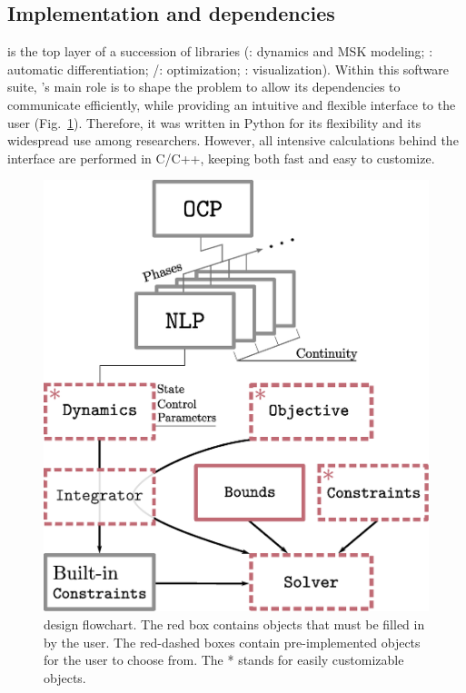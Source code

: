 \subsection{Implementation and dependencies}
\bioptim is the top layer of a succession of libraries (\biorbd: dynamics and MSK modeling; \casadi: automatic differentiation; \ipopt/\acados: optimization; \bioviz: visualization).
Within this software suite, \bioptim 's main role is to shape the problem to allow its dependencies to communicate efficiently, while providing an intuitive and flexible interface to the user (Fig.~\ref{fig:dependencies}).
Therefore, it was written in Python for its flexibility and its widespread use among researchers.
However, all intensive calculations behind the interface are performed in C/C++, keeping \bioptim both fast and easy to customize.

\begin{figure}[t!]
\centering
\includegraphics[width=0.9\columnwidth]{figures/design.eps}
\caption{\bioptim design flowchart. The red box contains objects that must be filled in by the user. The red-dashed boxes contain pre-implemented objects for the user to choose from. The * stands for easily customizable objects.}
\label{fig:dependencies}
\vspace*{-0.5cm}
\end{figure}


